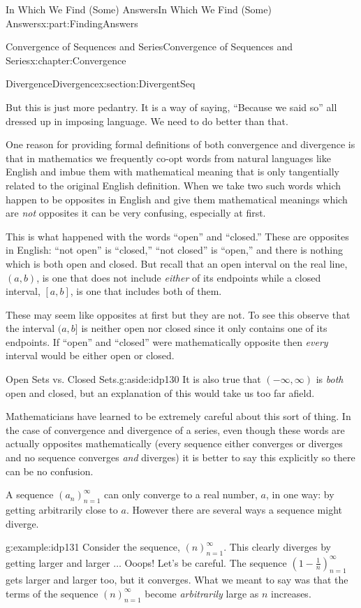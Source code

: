 \begin{partptx}{In Which We Find (Some) Answers}{}{In Which We Find (Some) Answers}{}{}{x:part:FindingAnswers}
\begin{chapterptx}{Convergence of Sequences and Series}{}{Convergence of Sequences and Series}{}{}{x:chapter:Convergence}
\begin{sectionptx}{Divergence}{}{Divergence}{}{}{x:section:DivergentSeq}
			\par
			But this is just more pedantry. It is a way of saying, ``Because we said so'' all dressed up in imposing language. We need to do better than that.%
			\par
			One reason for providing formal definitions of both convergence and divergence is that in mathematics we frequently co-opt words from natural languages like English and imbue them with mathematical meaning that is only tangentially related to the original English definition. When we take two such words which happen to be opposites in English and give them mathematical meanings which are \emph{not} opposites it can be very confusing, especially at first.%
			\par
			This is what happened with the words ``open'' and ``closed.'' These are opposites in English: ``not open'' is ``closed,'' ``not closed'' is ``open,'' and there is nothing which is both open and closed. But recall that an open interval on the real line, \((a,b)\), is one that does not include \emph{either} of its endpoints while a closed interval, \([a,b]\), is one that includes both of them.%
			\par
			These may seem like opposites at first but they are not.  To see this observe that the interval \((a,b]\) is neither open nor closed since it only contains one of its endpoints. If ``open'' and ``closed'' were mathematically opposite then \emph{every} interval would be either open or closed.%
			\begin{aside}{Open Sets vs. Closed Sets.}{g:aside:idp130}%
				It is also true that \((-\infty,\infty)\) is \emph{both} open and closed, but an explanation of this would take us too far afield.%
			\end{aside}
			Mathematicians have learned to be extremely careful about this sort of thing. In the case of convergence and divergence of a series, even though these words are actually opposites mathematically (every sequence either converges or diverges and no sequence converges \emph{and} diverges) it is better to say this explicitly so there can be no confusion.%
			\par
			A sequence \(\left(a_n\right)_{n=1}^\infty\) can only converge to a real number, \(a\), in one way: by getting arbitrarily close to \(a\). However there are several ways a sequence might diverge.%
			\begin{example}{}{g:example:idp131}%
				Consider the sequence, \(\left(n\right)_{n=1}^\infty\). This clearly diverges by getting larger and larger \(\ldots\) Ooops! Let's be careful. The sequence \(\left(1-\frac1n\right)_{n=1}^\infty\) gets larger and larger too, but it converges. What we meant to say was that the terms of the sequence \(\left(n\right)_{n=1}^\infty\) become \emph{arbitrarily} large as \(n\) increases.%

\end{example}
\end{sectionptx}
\end{chapterptx}
\end{partptx}
